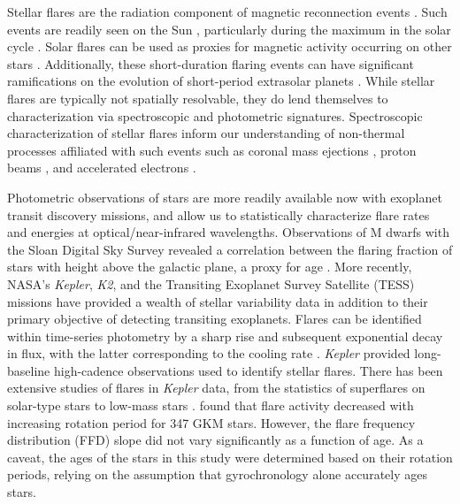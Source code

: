 \documentclass[twocolumn, linenumbers]{aastex631}
\begin{document}
Stellar flares are the radiation component of magnetic reconnection events \citep{benz10}. Such events are readily seen on the Sun \citep{carrington1859, lu91, fletcher11},
particularly during the maximum in the solar cycle \citep{webb94}. Solar flares can be used as proxies for magnetic activity occurring on other stars
\citep{feigelson99, berdyugina05, kowalski10, feinstein22_criticality}. Additionally, these short-duration flaring events can have significant ramifications on the evolution
of short-period extrasolar planets \citep{france16, guenther19_flares, chen21}. While stellar flares are typically not spatially resolvable, they do lend themselves to
characterization via spectroscopic and photometric signatures. Spectroscopic characterization of stellar flares inform our understanding of non-thermal processes
affiliated with such events such as coronal mass ejections \citep{argiroffi19, vida19}, proton beams \citep{orrall76, woodgate92}, and accelerated electrons \citep{osten05, smith05}.

Photometric observations of stars are more readily available now with exoplanet transit discovery missions, and allow us to statistically characterize flare rates
and energies at optical/near-infrared wavelengths. Observations of M dwarfs with the Sloan Digital Sky Survey revealed a correlation between the flaring fraction of
stars with height above the galactic plane, a proxy for age \citep{kowalski09, hilton10}. More recently, NASA's \textit{Kepler}, \textit{K2}, and the Transiting
Exoplanet Survey Satellite (TESS) missions have provided a wealth of stellar variability data in addition to their primary objective of detecting transiting exoplanets.
Flares can be identified within time-series photometry by a sharp rise and subsequent exponential decay in flux,  with the latter corresponding to the cooling rate
\citep{kowalski13}. \textit{Kepler} \citep{Borucki10} provided long-baseline high-cadence observations used to identify stellar flares. There has been extensive studies
of flares in \textit{Kepler} data, from the statistics of superflares on solar-type stars \citep[e.g.][]{notsu13, shibayama13, maehara15, okamoto21} to low-mass stars
\citep[e.g.][]{Hawley14, silverberg16}. \cite{davenport19} found that flare activity decreased with increasing rotation period for 347 GKM stars. However, the flare
frequency distribution (FFD) slope did not vary significantly as a function of age. As a caveat, the ages of the stars in this study were determined based on their
rotation periods, relying on the assumption that gyrochronology alone accurately ages stars.
\end{document}
